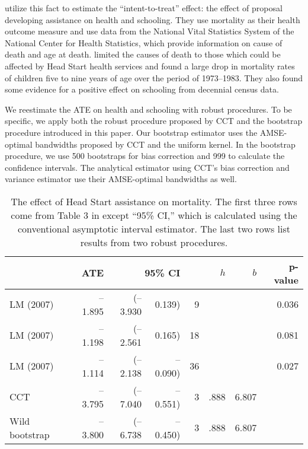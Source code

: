 \documentclass[12pt,fleqn]{article}
\begin{document}
\cite{ludwig2007} utilize this fact to estimate the ``intent-to-treat'' effect:
the effect of proposal developing assistance on health and schooling. They use
mortality as their health outcome measure and use data from the National Vital
Statistics System of the National Center for Health Statistics, which provide
information on cause of death and age at death. \cite{ludwig2007} limited the
causes of death to those which could be affected by Head Start health services
and found a large drop in mortality rates of children five to nine years of age
over the period of 1973--1983. They also found some evidence for a positive
effect on schooling from decennial census data.

We reestimate the ATE on health and schooling with robust procedures. To be
specific, we apply both the robust procedure proposed by CCT and the bootstrap
procedure introduced in this paper.  Our bootstrap estimator uses the
AMSE-optimal bandwidths proposed by CCT and the uniform kernel. In the bootstrap
procedure, we use 500 bootstraps for bias correction and 999 to calculate the
confidence intervals. The analytical estimator using CCT's bias correction and variance estimator use
their AMSE-optimal bandwidths as well.

\begin{table}[t]
  \centering
  \begin{tabular}{lrr@{, }rr@{}rrr}
    \toprule
                      & ATE     & \multicolumn{2}{r}{95\% CI}            &     &  $h$ &   $b$ & p-value \\
    \midrule
    LM (2007)         & --1.895 & (--3.930                    & 0.139)   & 9   &      &       & 0.036 \\
    LM (2007)         & --1.198 & (--2.561                    & 0.165)   & 18  &      &       & 0.081 \\
    LM (2007)         & --1.114 & (--2.138                    & --0.090) & 36  &      &       & 0.027 \\
    CCT               & --3.795 & (--7.040                    & --0.551) & 3   & .888 & 6.807 &       \\ 
    Wild bootstrap    & --3.800 & (--6.738                    & --0.450) & 3   & .888 & 6.807 &       \\
    \bottomrule
  \end{tabular}
  \caption{The effect of Head Start assistance on mortality. The first three
    rows come from Table 3 in \cite{ludwig2007} except ``95\% CI,'' which is
    calculated using the conventional asymptotic interval estimator.
    The last two rows list results from two robust procedures.}
  \label{tbl:2}
\end{table}
\end{document}
